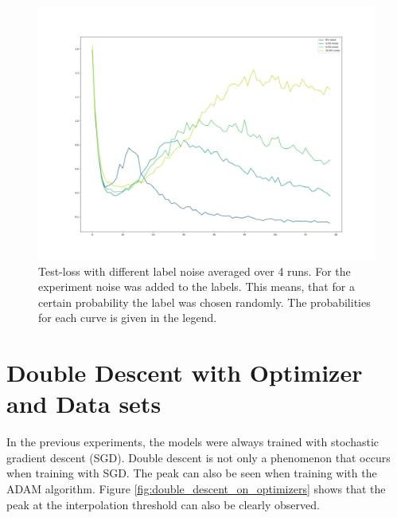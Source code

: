 \begin{figure}[!htp]
\centering
\includegraphics[width= 1\linewidth]{Abschlussarbeit_2021/LaTeX/images/many_curves_less_noise.png}
\caption{Test-loss with different label noise averaged over 4 runs. For the experiment noise was added to the labels. This means, that for a certain probability the label was chosen randomly. The probabilities for each curve is given in the legend.}
\label{fig:Label_noise_on_double_descent}
\end{figure}


\newpage
\section{Double Descent with Optimizer and Data sets}

In the previous experiments, the models were always trained with stochastic gradient descent (SGD). 
Double descent is not only a phenomenon that occurs when training with SGD. The peak can also be seen when training with the ADAM algorithm.
Figure \ref{fig:double_descent_on_optimizers} shows that the peak at the interpolation threshold can also be clearly observed. 

